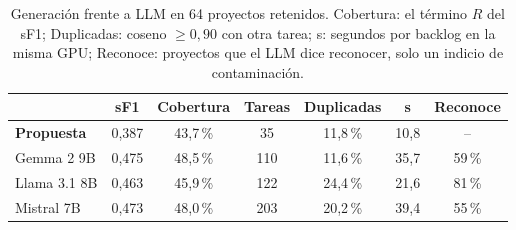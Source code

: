 \begin{table}[t]
\centering
\caption{Generación frente a LLM en 64 proyectos retenidos. Cobertura: el término $R$ del sF1; Duplicadas: coseno $\geq 0{,}90$ con otra tarea; s: segundos por backlog en la misma GPU; Reconoce: proyectos que el LLM dice reconocer, solo un indicio de contaminación.}
\label{tab:llm_generacion}
\footnotesize
\setlength{\tabcolsep}{2.5pt}
\begin{tabular}{lcccccc}
\toprule
 & sF1 & Cobertura & Tareas & Duplicadas & s & Reconoce \\
\midrule
\textbf{Propuesta} & 0{,}387 & 43{,}7\,\% & 35 & 11{,}8\,\% & 10{,}8 & -- \\
Gemma 2 9B & 0{,}475 & 48{,}5\,\% & 110 & 11{,}6\,\% & 35{,}7 & 59\,\% \\
Llama 3.1 8B & 0{,}463 & 45{,}9\,\% & 122 & 24{,}4\,\% & 21{,}6 & 81\,\% \\
Mistral 7B & 0{,}473 & 48{,}0\,\% & 203 & 20{,}2\,\% & 39{,}4 & 55\,\% \\
\bottomrule
\end{tabular}
\end{table}
